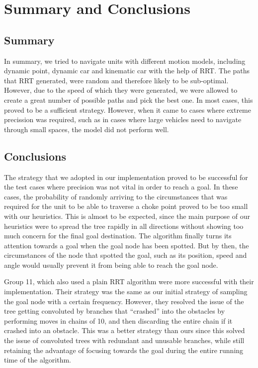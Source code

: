 \documentclass[a4paper,12pt]{article}
\begin{document}
\section{Summary and Conclusions}
\label{sec:summary}
\subsection{Summary}
In summary, we tried to navigate units with different motion models, including dynamic point, dynamic car and kinematic car with the help of RRT. The paths that RRT generated, were random and therefore likely to be sub-optimal. However, due to the speed of which they were generated, we were allowed to create a great number of possible paths and pick the best one.
In most cases, this proved to be a sufficient strategy. However, when it came to cases where extreme precission was required, such as in cases where large vehicles need to navigate through small spaces, the model did not perform well.
\subsection{Conclusions}
The strategy that we adopted in our implementation proved to be successful for the test cases where precision was not vital in order to reach a goal.
In these cases, the probability of randomly arriving to the circumstances that was required for the unit to be able to traverse a choke point proved to be too small with our heuristics.
This is almost to be expected, since the main purpose of our heuristics were to spread the tree rapidly in all directions without showing too much concern for the final goal destination.
The algorithm finally turns its attention towards a goal when the goal node has been spotted. But by then, the circumstances of the node that spotted the goal, such as its position, speed and angle would usually prevent it from being able to reach the goal node. 

Group 11, which also used a plain RRT algorithm were more successful with their implementation. Their strategy was the same as our initial strategy of sampling the goal node with a certain frequency. However, they resolved the issue of the tree getting convoluted by branches that “crashed” into the obstacles by performing moves in chains of 10, and then discarding the entire chain if it crashed into an obstacle.
This was a better strategy than ours since this solved the issue of convoluted trees with redundant and unusable branches, while still retaining the advantage of focusing towards the goal during the entire running time of the algorithm.

\pagebreak
{}

\end{document}
